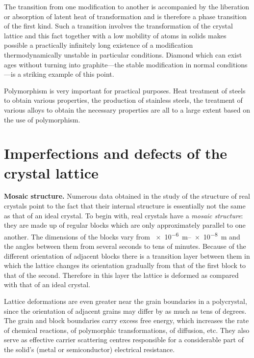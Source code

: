 The transition from one modification to another is accompanied by the liberation or absorption of latent heat of transformation and is therefore a phase transition of the first kind. Such a transition involves the transformation of the crystal lattice and this fact together with a low mobility of atoms in solids makes possible a practically infinitely long existence of a modification thermodynamically unstable in particular conditions. Diamond which can exist ages without turning into graphite---the stable modification in normal conditions---is a striking example of this point.

Polymorphism is very important for practical purposes. Heat treatment of steels to obtain various properties, the production of stainless steels, the treatment of various alloys to obtain the necessary properties are all to a large extent based on the use of polymorphism.

\section{Imperfections and defects of the crystal lattice}\label{sec:12}

\textbf{Mosaic structure.} Numerous data obtained in the study of the structure of real crystals point to the fact that their internal structure is essentially not the same as that of an ideal crystal. To begin with, real crystals have a \textit{mosaic structure}: they are made up of regular blocks which are only approximately parallel to one another. The dimensions of the blocks vary from \SIrange{e-6}{e-8}{\metre} and the angles between them from several seconds to tens of minutes. Because of the different orientation of adjacent blocks there is a transition layer between them in which the lattice changes its orientation gradually from that of the first block to that of the second. Therefore in this layer the lattice is deformed as compared with that of an ideal crystal.

Lattice deformations are even greater near the grain boundaries in a polycrystal, since the orientation of adjacent grains may differ by as much as tens of degrees. The grain and block boundaries carry excess free energy, which increases the rate of chemical reactions, of polymorphic transformations, of diffusion, etc. They also serve as effective carrier scattering centres responsible for a considerable part of the solid's (metal or semiconductor) electrical resistance.

